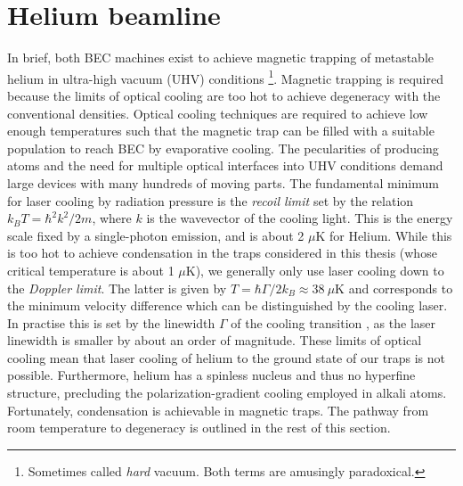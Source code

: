 \section{Helium beamline}
	In brief, both BEC machines exist to achieve magnetic trapping of metastable helium in ultra-high vacuum (UHV) conditions \footnote{Sometimes called \emph{hard} vacuum. Both terms are amusingly paradoxical.}. Magnetic trapping is required because the limits of optical cooling are too hot to achieve degeneracy with the conventional densities. Optical cooling techniques are required to achieve low enough temperatures such that the magnetic trap can be filled with a suitable population to reach BEC by evaporative cooling. The pecularities of producing \mhe atoms and the need for multiple optical interfaces into UHV conditions demand large devices with many hundreds of moving parts. 
	The fundamental minimum for laser cooling by radiation pressure is the \emph{recoil limit} set by the relation $k_B T = \hbar^2k^2/2m$, where $k$ is the wavevector of the cooling light. This is the energy scale fixed by a single-photon emission, and is about 2 $\mu$K for Helium. While this is too hot to achieve condensation in the traps considered in this thesis (whose critical temperature is about 1 $\mu$K), we generally only use laser cooling down to the \emph{Doppler limit}. The latter is given by $T = \hbar\Gamma/2 k_B\approx 38~\mu$K and corresponds to the minimum velocity difference which can be distinguished by the cooling laser. In practise this is set by the linewidth $\Gamma$ of the cooling transition , as the laser linewidth is smaller by about an order of magnitude\cite{shin16}. These limits of optical cooling mean that laser cooling of helium to the ground state of our traps is not possible. Furthermore, helium has a spinless nucleus and thus no hyperfine structure, precluding the polarization-gradient cooling employed in alkali atoms. Fortunately, condensation is achievable in magnetic traps. The pathway from room temperature to degeneracy is outlined in the rest of this section.


